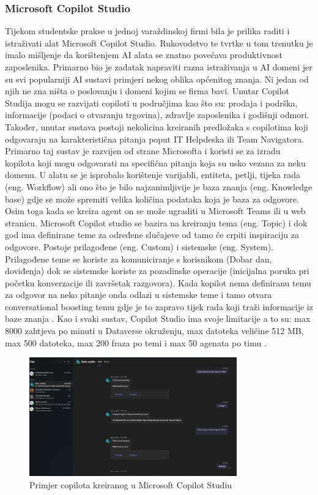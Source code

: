 \documentclass[]{foi}
\begin{document}
\subsubsection{Microsoft Copilot Studio}
Tijekom studentske prakse u jednoj varaždinskoj firmi bila je prilika raditi i istraživati alat Microsoft Copilot Studio. Rukovodstvo te tvrtke u tom trenutku je imalo mišljenje da korištenjem 
AI alata se znatno povećava produktivnost zaposlenika. Primarno bio je zadatak napraviti razna istraživanja u AI domeni jer su svi popularniji AI sustavi primjeri nekog oblika općenitog znanja. 
Ni jedan od njih ne zna ništa o poslovanju i domeni kojim se firma bavi. Unutar Copilot Studija mogu se razvijati copiloti u područjima kao što su: prodaja i podrška, informacije (podaci o otvaranju trgovina), 
zdravlje zaposlenika i godišnji odmori. Također, unutar sustava postoji nekolicina kreiranih predložaka s copilotima koji odgovaraju na karakteristična pitanja poput IT Helpdeska ili Team Navigatora. 
Primarno taj sustav je razvijen od strane Microsofta i koristi se za izradu kopilota koji mogu odgovarati na specifična pitanja koja su usko vezana za neku domenu. U alatu se je isprobalo korištenje varijabli, entiteta, 
petlji, tijeka rada (eng. Workflow) ali ono što je bilo najzanimljivije je baza znanja (eng. Knowledge base) gdje se može spremiti velika količina podataka koja je baza za odgovore. Osim toga kada se kreira agent on se može 
ugraditi u Microsoft Teams ili u web stranicu. Microsoft Copilot studio se bazira na kreiranju tema (eng. Topic) i dok god ima definirane teme za određene slučajeve od tamo će crpiti 
inspiraciju za odgovore. Postoje prilagođene (eng. Custom) i sistemske (eng. System). Prilagođene teme se koriste za komuniciranje s korisnikom (Dobar dan, doviđenja) dok se sistemske koriste
za pozadinske operacije (inicijalna poruka pri početku konverzacije ili završetak razgovora). Kada kopilot nema definiranu temu za odgovor na neko pitanje onda odlazi u sistemske teme i tamo 
otvara conversational boosting temu gdje je to zapravo tijek rada koji traži informacije iz baze znanja \cite{copilot2025}. Kao i svaki sustav, Copilot Studio ima svoje limitacije 
a to su: max 8000 zahtjeva po minuti u Dataverse okruženju, max datoteka veličine 512 MB, max 500 datoteka, max 200 fraza po temi i max 50 agenata po timu \cite{quotas2025}.

\begin{figure}[ht!]
    \centering
    \includegraphics[width=0.8\textwidth]{./assets/Primjer_agenta_kreiranog_u_Copilot_Studiu.png} 
    \caption{Primjer copilota kreiranog u Microsoft Copilot Studiu}
    \label{fig:slika2}
\end{figure}
\end{document}
